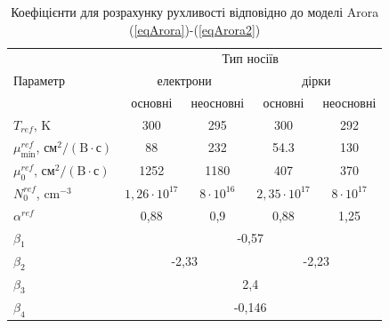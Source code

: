 \documentclass[12pt,a4paper,titlepage,oneside]{book}
\numberwithin{equation}{part}
\begin{document}
\begin{table}
\caption{Коефіцієнти для розрахунку рухливості відповідно до моделі Arora (\ref{eqArora})-(\ref{eqArora2})}
\label{tblArora}
\centering
\begin{tabular}{|l|c|c|c|c|}
\hline
\multirow{3}{*}{Параметр} & \multicolumn{4}{c|}{Тип носіїв}\\
\cline{2-5}
&\multicolumn{2}{c|}{електрони}&\multicolumn{2}{c|}{дірки}\\
\cline{2-5}
& основні \cite{Arora1982}& неосновні \cite{Swirhun1986}& основні \cite{Arora1982}& неосновні \cite{Alamo1985}\\
\hline
$T_{ref}$, K&300&295&300&292\\
\hline
$\mu_\mathrm{min}^{ref}$, $\text{см}^2/(\text{B}\cdot\text{с})$&88&232&54.3&130\\
\hline
$\mu_0^{ref}$, $\text{см}^2/(\text{B}\cdot\text{с})$&1252&1180&407&370\\
\hline
$N_0^{ref}$, cm$^{-3}$&$1,26\cdot10^{17}$&$8\cdot10^{16}$&$2,35\cdot10^{17}$&$8\cdot10^{17}$\\
\hline
$\alpha^{ref}$&0,88&0,9&0,88&1,25\\
\hline
$\beta_1$&\multicolumn{4}{c|}{-0,57}\\
\hline
$\beta_2$&\multicolumn{2}{c|}{-2,33}&\multicolumn{2}{c|}{-2,23}\\
\hline
$\beta_3$&\multicolumn{4}{c|}{2,4}\\
\hline
$\beta_4$&\multicolumn{4}{c|}{-0,146}\\
\hline
\end{tabular}
\end{table}
\end{document}
